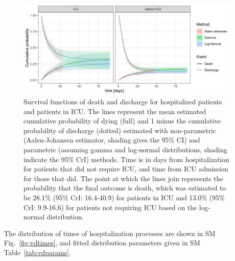 \begin{figure}[!htb]
    \centering
    \includegraphics[width=.8\textwidth]{fig_covid-switzerland-npi/fig_supp/survival_analaysis.png}
    \caption[Survival functions of death and discharge for hospitalized patients and patients in ICU]{Survival functions of death and discharge for hospitalized patients and patients in ICU. The lines represent the mean estimated cumulative probability of dying (full) and 1 minus the cumulative probability of discharge (dotted) estimated with non-parametric (Aalen-Johansen estimator, shading gives the 95\% CI) and parametric (assuming gamma and log-normal distributions, shading indicate the 95\% CrI) methods. Time is in days from hospitalization for patients that did not require ICU, and time from ICU admission for those that did. The point at which the lines join represents the probability that the final outcome is death, which was estimated to be 28.1\% (95\% CrI: 16.4-40.9) for patients in ICU and 13.0\% (95\% CrI: 9.9-16.6) for patients not requiring ICU based on the log-normal distribution.}
    \label{fig:delays}
\end{figure}

\noindent The distribution of times of hospitalization processes are shown in SM Fig.~\ref{fig:vdtimes}, and fitted distribution parameters given in SM Table~\ref{tab:vdparams}.

